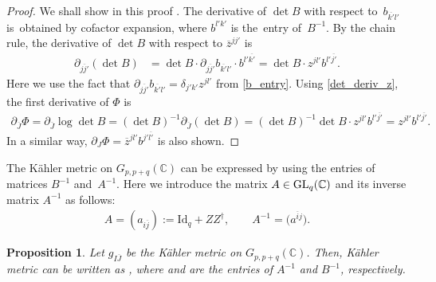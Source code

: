 \documentclass[10pt,a4paper]{amsart}
\numberwithin{equation}{section}
\newtheorem{Proposition}[Theorem]{Proposition}
 { \theoremstyle{definition}
\newtheorem{Definition}[Theorem]{Definition}
\newtheorem{Note}[Theorem]{Note}
\newtheorem{Example}[Theorem]{Example}
\newtheorem{Remark}[Theorem]{Remark} }
\begin{document}
\begin{proof}
We shall
show
in this proof
.
The derivative of
$
\det
B
$
with respect to~$b_{\overline{k'}l'}$ is~obtained
by cofactor expansion, where $b^{l'k'}$ is the~entry of~$B^{-1}$.
By the chain rule, the derivative of
$
\det
B
$
with respect to $\overline{z}^{jj'}$ is
\begin{align}
 \partial_{\overline{jj'}}
 (
 \det
 B
 )
 &=
 \det
 B
 \cdot
 \partial_{\overline{jj'}}
 b_{\overline{k'}l'}
 \cdot
 b^{l'\overline{k'}}
=
 \det
 B
 \cdot
 z^{jl'}
 b^{l'\overline{j'}}.
 \label{det_deriv_z}
\end{align}
Here we use the fact that
$
\partial_{\overline{jj'}}
b_{\overline{k'}l'}
=
\delta_{j'
k'
}
z^{jl'}
$
from \eqref{b_entry}.
Using \eqref{det_deriv_z}, the first derivative of $\Phi$ is
\begin{align*}
 \partial_{\overline{J}}
 \Phi
 =
 \partial_{\overline{J}}
 \log
 \det
 B
 =
 (
 \det
 B
 )^{-1}
 \partial_{\overline{J}}
 (
 \det
 B
 )
 =
 (
 \det
 B
 )^{-1}
 \det
 B
 \cdot
 {z}^{jl'}
 b^{l'\overline{j'}}
 =
 z^{jl'}
 b^{l'\overline{j'}}.
\end{align*}
In a similar way,
$
 \partial_{J}
 \Phi
 =
 \overline{z}^{jl'}
 b^{j'\overline{l'}}
$
is also shown.%
\end{proof}


The K\"ahler metric
on
$G_{p,p+q}(\mathbb{C})$ can be expressed by using the entries of matrices $B^{-1}$ and~$
 A^{-1}
$. Here we introduce the matrix
$
 A
 \in
 {\rm GL}_{q}
 (\mathbb{C})
$
and its inverse matrix $A^{-1}$ as follows:
\begin{align*}
 A
 =
 (
 a_{i\overline{j}}
 )
 :=
 \mathrm{Id}_{q}
 +
 Z
 Z^{\dagger},
 \qquad
 A^{-1}
 =
 \bigl(
 a^{\overline{i}j}
 \bigr).
\end{align*}

\begin{Proposition}\label{thm_metric_mtx}
Let $g_{I\overline{J}}$ be the K\"ahler metric
on $G_{p,p+q}(\mathbb{C})$. Then, K\"ahler metric
can be written as
,
where  and  are the entries of
$
 A^{-1}
$
and
$
 B^{-1}
$,
respectively.
\end{Proposition}
\end{document}

